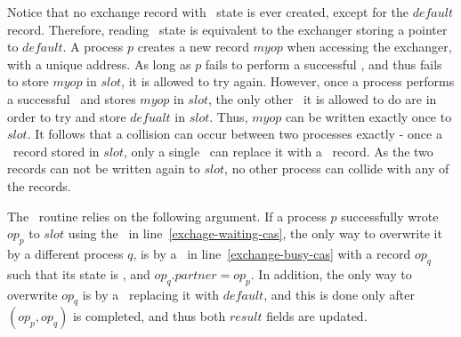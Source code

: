 Notice that no exchange record with \emptyst\ state is ever created, except for the $default$ record. Therefore, reading \emptyst\ state is equivalent to the exchanger storing a pointer to $default$. A process $p$ creates a new record $myop$ when accessing the exchanger, with a unique address. As long as $p$ fails to perform a successful \CAS, and thus fails to store $myop$ in $slot$, it is allowed to try again. However, once a process performs a successful \CAS\ and stores $myop$ in $slot$, the only other \CAS\ it is allowed to do are in order to try and store $defualt$ in $slot$. Thus, $myop$ can be written exactly once to $slot$. It follows that a collision can occur between two processes exactly - once a \waiting\ record stored in $slot$, only a single \CAS\ can replace it with a \busy\ record. As the two records can not be written again to $slot$, no other process can collide with any of the records.

The \recoverExchange\ routine relies on the following argument. If a process $p$ successfully wrote $op_p$ to $slot$ using the \CAS\ in line~\ref{exchage-waiting-cas}, the only way to overwrite it by a different process $q$, is by a \CAS\ in line~\ref{exchange-busy-cas} with a record $op_q$ such that its state is \busy, and $op_q.partner = op_p$. In addition, the only way to overwrite $op_q$ is by a \CAS\ replacing it with $default$, and this is done only after \switchPair$(op_p, op_q)$ is completed, and thus both $result$ fields are updated.

